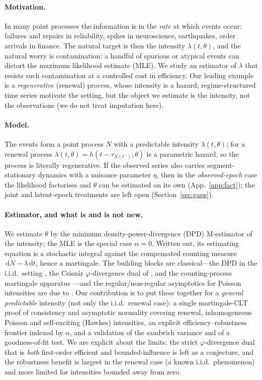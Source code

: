 \documentclass[11pt]{article}
\newcommand{\dd}{\,\mathrm{d}}
\begin{document}
\paragraph{Motivation.}
In many point processes the information is in the \emph{rate} at which events
occur: failures and repairs in reliability, spikes in neuroscience, earthquakes,
order arrivals in finance. The natural target is then the intensity
$\lambda(t,\theta)$, and the natural worry is contamination: a handful of spurious
or atypical events can distort the maximum likelihood estimate (MLE). We study an
estimator of $\lambda$ that resists such contamination at a controlled cost in
efficiency. Our leading example is a \emph{regenerative} (renewal) process, whose
intensity is a hazard; regime-structured time series motivate the setting, but the
object we estimate is the intensity, not the observations (we do not treat
imputation here).

\paragraph{Model.}
The events form a point process $N$ with a predictable intensity
$\lambda(t,\theta)$; for a renewal process
$\lambda(t,\theta)=h(t-\tau_{N(t^-)};\theta)$ is a parametric hazard, so the
process is literally regenerative. If the observed series also carries
segment-stationary dynamics with a nuisance parameter $\eta$, then in the
\emph{observed-epoch} case the likelihood factorises and $\theta$ can be estimated
on its own (App.~\ref{app:fact}); the joint and latent-epoch treatments are left
open (Section~\ref{sec:gaps}).

\paragraph{Estimator, and what is and is not new.}
We estimate $\theta$ by the minimum density-power-divergence (DPD) M-estimator
\citep{basu1998} of the intensity; the MLE is the special case $\alpha=0$. Written
out, its estimating equation is a stochastic integral against the compensated
counting measure $\dd N-\lambda\dd t$, hence a martingale. The building blocks are
classical---the DPD in the i.i.d.\ setting \citep{basu1998}, the Csiszár
$\varphi$-divergence dual of \citet{bk2006,bk2009}, and the counting-process
martingale apparatus \citep{bremaud1981,abgk1993,rebolledo1980}---and the
regular/non-regular asymptotics for Poisson intensities are due to
\citet{kutoyants1984,kutoyants1998,ih1981,dachian2003}. Our contribution is to put
these together for a \emph{general predictable} intensity (not only the i.i.d.\
renewal case): a single martingale-CLT proof of consistency and asymptotic
normality covering renewal, inhomogeneous Poisson and self-exciting (Hawkes)
intensities, an explicit efficiency--robustness frontier indexed by $\alpha$, and a
validation of the sandwich variance and of a goodness-of-fit test. We are explicit
about the limits: the strict $\varphi$-divergence dual that is \emph{both}
first-order efficient and bounded-influence is left as a conjecture, and the
robustness benefit is largest in the renewal case (a known i.i.d.\ phenomenon) and
more limited for intensities bounded away from zero.
\end{document}
